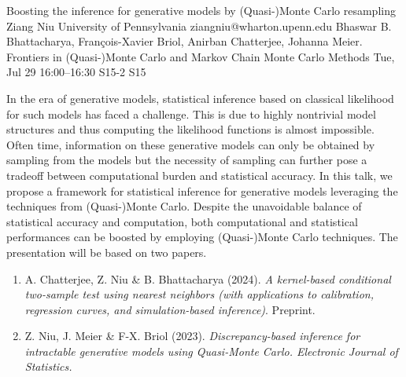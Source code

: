 \begin{talk}
  {Boosting the inference for generative models by (Quasi-)Monte Carlo resampling}%
  {Ziang Niu}%
  {University of Pennsylvania}%
  {ziangniu@wharton.upenn.edu}%
  {Bhaswar B. Bhattacharya, Fran\c{c}ois-Xavier Briol, Anirban Chatterjee, Johanna Meier.}%
  {Frontiers in (Quasi-)Monte Carlo and Markov Chain Monte Carlo Methods}%
  {Tue, Jul 29 16:00--16:30}%
  {S15-2}%
  {S15}%
    
   
In the era of generative models, statistical inference based on classical likelihood for such models has faced a challenge. This is due to highly nontrivial model structures and thus computing the likelihood functions is almost impossible. Often time, information on these generative models can only be obtained by sampling from the models but the necessity of sampling can further pose a tradeoff between computational burden and statistical accuracy. In this talk, we propose a framework for statistical inference for generative models leveraging the techniques from (Quasi-)Monte Carlo. Despite the unavoidable balance of statistical accuracy and computation, both computational and statistical performances can be boosted by employing (Quasi-)Monte Carlo techniques. The presentation will be based on two papers.

\begin{enumerate}
 \item[{[1]}] A. Chatterjee, Z. Niu \& B. Bhattacharya (2024). {\it A kernel-based conditional two-sample test using nearest neighbors (with applications to calibration, regression curves, and simulation-based inference)}. Preprint.
 \item[{[2]}] Z. Niu, J. Meier \& F-X. Briol (2023). \it{Discrepancy-based inference for
  intractable generative models using
  Quasi-Monte Carlo.} Electronic Journal of Statistics.
\end{enumerate}

\medskip

\end{talk}

